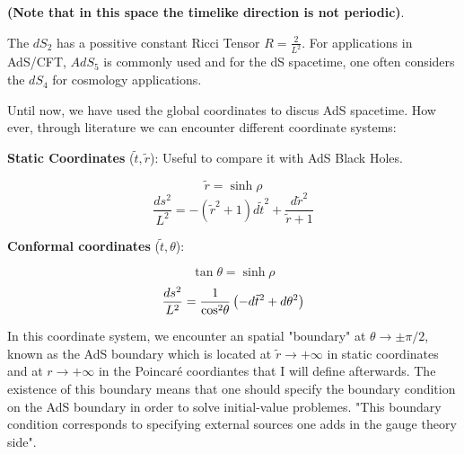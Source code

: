 \documentclass[12pt]{article}
\begin{document}
\textbf{(Note that in this space the timelike direction is not periodic)}.

\vspace{0.5cm}

The \( dS_2 \) has a possitive constant Ricci Tensor \(R = \frac{2}{L^2}\). For applications in AdS/CFT, \( AdS_5 \) is commonly used and for the dS spacetime, one often considers the \( dS_4 \) for cosmology applications.

Until now, we have used the global coordinates to discus AdS spacetime. How ever, through literature we can encounter different coordinate systems:

\vspace{0.5cm}

\textbf{Static Coordinates} (\( \tilde{t}, \tilde{r} \)): Useful to compare it with AdS Black Holes.

\begin{equation}
    \tilde{r} = \sinh{ \rho }
\end{equation}
\begin{equation}
    \frac{ds^2}{L^2} = -(\tilde{r}^2 + 1)d\tilde{t}^2 + \frac{d\tilde{r}^2}{\tilde{r} + 1}
\end{equation}

\textbf{Conformal coordinates} (\( \tilde{t}, \theta \)):

\begin{equation}
    \tan{ \theta } = \sinh{ \rho }
\end{equation}
\begin{equation}
    \frac{ds^2}{L^2} = \frac{ 1 }{ \cos^2{ \hspace{-2pt}\theta } }\left(-d\tilde{t}^2+d\theta^2\right)
\end{equation}

In this coordinate system, we encounter an spatial "boundary" at \( \theta \rightarrow \pm \pi/2 \), known as the AdS boundary which is located at \( \tilde{ r } \rightarrow +\infty \) in static coordinates and at \( r \rightarrow +\infty \) in the Poincaré coordiantes that I will define afterwards. The existence of this boundary means that one should specify the boundary condition on the AdS boundary in order to solve initial-value problemes.  "This boundary condition corresponds to specifying external sources one adds in the gauge theory side".

\vspace{.5cm}
\end{document}
